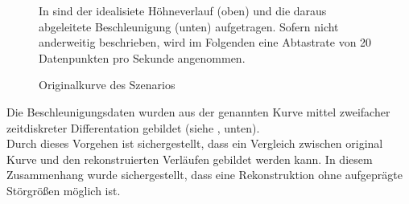 \begin{figure}[ht!]
\vspace{0.25cm}
\begin{center}
\caption{Originalkurve des Szenarios}
\label{fig:SzeneOrigin}
\end{center}

\vspace{0.25cm}
In  sind der idealisiete Höhneverlauf (oben) und die daraus abgeleitete Beschleunigung (unten) aufgetragen. Sofern nicht anderweitig beschrieben, wird im Folgenden eine Abtastrate von 20 Datenpunkten pro Sekunde angenommen.
\end{figure}

Die Beschleunigungsdaten wurden aus der genannten Kurve mittel zweifacher zeitdiskreter Differentation gebildet (siehe , unten).\\
Durch dieses Vorgehen ist sichergestellt, dass ein Vergleich zwischen original Kurve und den rekonstruierten Verläufen gebildet werden kann. In diesem Zusammenhang wurde sichergestellt, dass eine Rekonstruktion ohne aufgeprägte Störgrößen möglich ist. %


